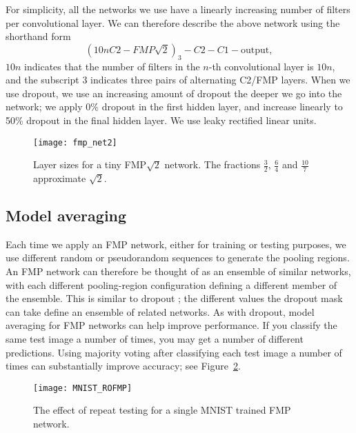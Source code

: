 \documentclass[english]{article}
\begin{document}
For simplicity, all the networks we use have a linearly increasing
number of filters per convolutional layer. We can therefore describe
the above network using the shorthand form
\[
(10nC2-FMP\sqrt{2})_{3}-C2-C1-\mathrm{output,}
\]
$10n$ indicates that the number of filters in the $n$-th convolutional
layer is $10n$, and the subscript 3 indicates three pairs of alternating
C2/FMP layers. When we use dropout, we use an increasing amount of
dropout the deeper we go into the network; we apply 0\% dropout in
the first hidden layer, and increase linearly to 50\% dropout in the
final hidden layer. We use leaky rectified linear units.

\begin{figure}
\begin{centering}
\texttt{[image: fmp\_net2]}
\par\end{centering}

\caption{Layer sizes for a tiny FMP$\sqrt{2}$ network. The fractions $\tfrac{3}{2}$,
$\tfrac{6}{4}$ and $\tfrac{10}{7}$ approximate $\sqrt{2}$.\label{fig:Layer-sizes-for}}
\end{figure}



\subsection{Model averaging}

Each time we apply an FMP network, either for training or testing
purposes, we use different random or pseudorandom sequences to generate
the pooling regions. An FMP network can therefore be thought of as
an ensemble of similar networks, with each different pooling-region
configuration defining a different member of the ensemble. This is
similar to dropout \cite{dropout}; the different values the dropout
mask can take define an ensemble of related networks. As with dropout,
model averaging for FMP networks can help improve performance. If
you classify the same test image a number of times, you may get a
number of different predictions. Using majority voting after classifying
each test image a number of times can substantially improve accuracy;
see Figure~\ref{jury-size}.

\begin{figure}
\begin{centering}
\texttt{[image: MNIST\_ROFMP]}
\par\end{centering}

\caption{The effect of repeat testing for a single MNIST trained FMP network.
\label{jury-size}}
\end{figure}
\end{document}

